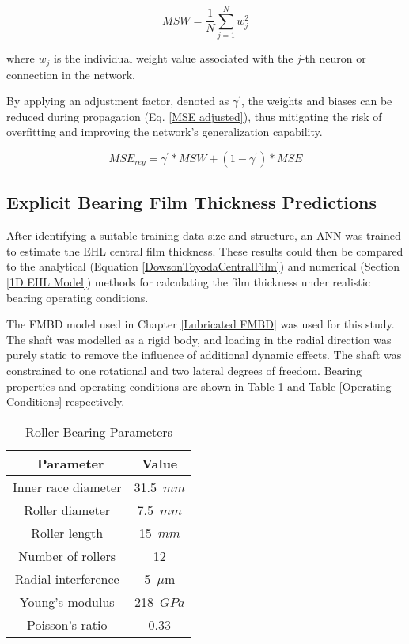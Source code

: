 \begin{equation}\label{MSW}
	M S W=\frac{1}{N} \sum_{j=1}^N w_j^2
\end{equation}

where $w_j$ is the individual weight value associated with the $j$-th neuron or connection in the network.

By applying an adjustment factor, denoted as $\gamma^{\prime}$, the weights and biases can be reduced during propagation (Eq. \ref{MSE adjusted}), thus mitigating the risk of overfitting and improving the network's generalization capability.

\begin{equation}\label{MSE adjusted}
	M S E_{r e g}=\gamma^{\prime} * M S W+\left(1-\gamma^{\prime}\right) * M S E
\end{equation}

\subsection{Explicit Bearing Film Thickness Predictions} \label{Explicit Bearing Film Thickness Predictions}
After identifying a suitable training data size and structure, an ANN was trained to estimate the EHL central film thickness. These results could then be compared to the analytical (Equation \ref{DowsonToyodaCentralFilm}) and numerical (Section \ref{1D EHL Model}) methods for calculating the film thickness under realistic bearing operating conditions.

The FMBD model used in Chapter \ref{Lubricated FMBD} was used for this study. The shaft was modelled as a rigid body, and loading in the radial direction was purely static to remove the influence of additional dynamic effects. The shaft was constrained to one rotational and two lateral degrees of freedom. Bearing properties and operating conditions are shown in Table \ref{Roller bearing parameters} and Table \ref{Operating Conditions} respectively.

\begin{table*}
	\caption{Roller Bearing Parameters}
	\label{Roller bearing parameters}
	\centering
	\renewcommand{\arraystretch}{1.5}%
	\begin{tabular}{|c|c|}
		\hline
		\ \textbf{Parameter} & \textbf{Value} \\ [0.5ex]
		\hline
		Inner race diameter & 31.5~$mm$ \\ [0.5ex]
		\hline
		Roller diameter & 7.5~$mm$ \\ [0.5ex]
		\hline
		Roller length & 15~$mm$ \\ [0.5ex]
		\hline
		Number of rollers & 12 \\ [0.5ex]
		\hline
		Radial interference & 5~$\mu \mathrm{m}$ \\ [0.5ex]
		\hline
		Young's modulus & 218~$GPa$ \\ [0.5ex]
		\hline
		Poisson's ratio & 0.33 \\ [0.5ex]
		\hline
	\end{tabular}
\end{table*}

